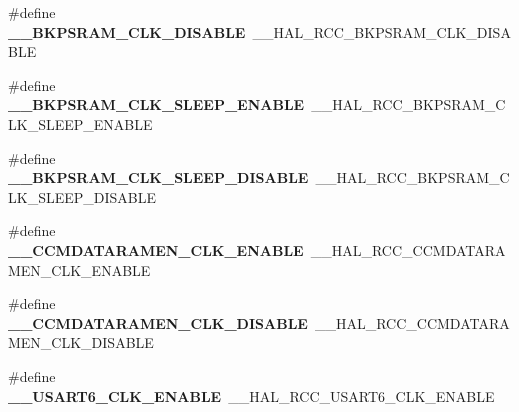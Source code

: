 \begin{DoxyCompactItemize}
\item 
\#define {\bfseries \+\_\+\+\_\+\+B\+K\+P\+S\+R\+A\+M\+\_\+\+C\+L\+K\+\_\+\+D\+I\+S\+A\+B\+LE}~\+\_\+\+\_\+\+H\+A\+L\+\_\+\+R\+C\+C\+\_\+\+B\+K\+P\+S\+R\+A\+M\+\_\+\+C\+L\+K\+\_\+\+D\+I\+S\+A\+B\+LE\hypertarget{group___h_a_l___r_c_c___aliased_ga8bdedfe40e391ab3fea620a0655aa221}{}\label{group___h_a_l___r_c_c___aliased_ga8bdedfe40e391ab3fea620a0655aa221}

\item 
\#define {\bfseries \+\_\+\+\_\+\+B\+K\+P\+S\+R\+A\+M\+\_\+\+C\+L\+K\+\_\+\+S\+L\+E\+E\+P\+\_\+\+E\+N\+A\+B\+LE}~\+\_\+\+\_\+\+H\+A\+L\+\_\+\+R\+C\+C\+\_\+\+B\+K\+P\+S\+R\+A\+M\+\_\+\+C\+L\+K\+\_\+\+S\+L\+E\+E\+P\+\_\+\+E\+N\+A\+B\+LE\hypertarget{group___h_a_l___r_c_c___aliased_ga1d57b2bcc7d644008f0fa757ef43f06e}{}\label{group___h_a_l___r_c_c___aliased_ga1d57b2bcc7d644008f0fa757ef43f06e}

\item 
\#define {\bfseries \+\_\+\+\_\+\+B\+K\+P\+S\+R\+A\+M\+\_\+\+C\+L\+K\+\_\+\+S\+L\+E\+E\+P\+\_\+\+D\+I\+S\+A\+B\+LE}~\+\_\+\+\_\+\+H\+A\+L\+\_\+\+R\+C\+C\+\_\+\+B\+K\+P\+S\+R\+A\+M\+\_\+\+C\+L\+K\+\_\+\+S\+L\+E\+E\+P\+\_\+\+D\+I\+S\+A\+B\+LE\hypertarget{group___h_a_l___r_c_c___aliased_ga350a0726c08b726815f58e4c5689db5a}{}\label{group___h_a_l___r_c_c___aliased_ga350a0726c08b726815f58e4c5689db5a}

\item 
\#define {\bfseries \+\_\+\+\_\+\+C\+C\+M\+D\+A\+T\+A\+R\+A\+M\+E\+N\+\_\+\+C\+L\+K\+\_\+\+E\+N\+A\+B\+LE}~\+\_\+\+\_\+\+H\+A\+L\+\_\+\+R\+C\+C\+\_\+\+C\+C\+M\+D\+A\+T\+A\+R\+A\+M\+E\+N\+\_\+\+C\+L\+K\+\_\+\+E\+N\+A\+B\+LE\hypertarget{group___h_a_l___r_c_c___aliased_gaa16691622e4f4f03061ab0c5778934dd}{}\label{group___h_a_l___r_c_c___aliased_gaa16691622e4f4f03061ab0c5778934dd}

\item 
\#define {\bfseries \+\_\+\+\_\+\+C\+C\+M\+D\+A\+T\+A\+R\+A\+M\+E\+N\+\_\+\+C\+L\+K\+\_\+\+D\+I\+S\+A\+B\+LE}~\+\_\+\+\_\+\+H\+A\+L\+\_\+\+R\+C\+C\+\_\+\+C\+C\+M\+D\+A\+T\+A\+R\+A\+M\+E\+N\+\_\+\+C\+L\+K\+\_\+\+D\+I\+S\+A\+B\+LE\hypertarget{group___h_a_l___r_c_c___aliased_ga25851169ddbfc457b597cfacc91173bd}{}\label{group___h_a_l___r_c_c___aliased_ga25851169ddbfc457b597cfacc91173bd}

\item 
\#define {\bfseries \+\_\+\+\_\+\+U\+S\+A\+R\+T6\+\_\+\+C\+L\+K\+\_\+\+E\+N\+A\+B\+LE}~\+\_\+\+\_\+\+H\+A\+L\+\_\+\+R\+C\+C\+\_\+\+U\+S\+A\+R\+T6\+\_\+\+C\+L\+K\+\_\+\+E\+N\+A\+B\+LE\hypertarget{group___h_a_l___r_c_c___aliased_ga2dfc83c494279808ed47f7842f0a40e6}{}\label{group___h_a_l___r_c_c___aliased_ga2dfc83c494279808ed47f7842f0a40e6}


\end{DoxyCompactItemize}
